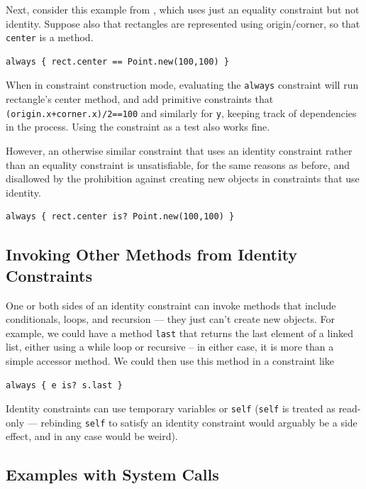 \documentclass{article}
\begin{document}
Next, consider this example from \cite{felgentreff-babelsberg-tr},
which uses just an equality constraint but not identity.  Suppose also
that rectangles are represented using origin/corner, so that
\verb|center| is a method.

\begin{verbatim}
always { rect.center == Point.new(100,100) }
\end{verbatim}

When in constraint construction mode, evaluating the \verb|always|
constraint will run rectangle's center method, and add primitive
constraints that \verb|(origin.x+corner.x)/2==100| and similarly for
\verb|y|, keeping track of dependencies in the process.  Using the
constraint as a test also works fine.

However, an otherwise similar constraint that uses an identity
constraint rather than an equality constraint is unsatisfiable, for
the same reasons as before, and disallowed by the prohibition against
creating new objects in constraints that use identity.

\begin{verbatim}
always { rect.center is? Point.new(100,100) }
\end{verbatim}

\subsection{Invoking Other Methods from Identity Constraints}

One or both sides of an identity constraint can invoke methods that
include conditionals, loops, and recursion --- they just can't create
new objects.  For example, we could have a method \verb|last| that
returns the last element of a linked list, either using a while loop
or recursive -- in either case, it is more than a simple accessor
method.  We could then use this method in a constraint like

\begin{verbatim}
always { e is? s.last }
\end{verbatim}

Identity constraints can use temporary variables or \verb|self|
(\verb|self| is treated as read-only --- rebinding \verb|self| to
satisfy an identity constraint would arguably be a side effect, and in
any case would be weird).


\subsection{Examples with System Calls}
\label{sec:system-calls}
\end{document}

